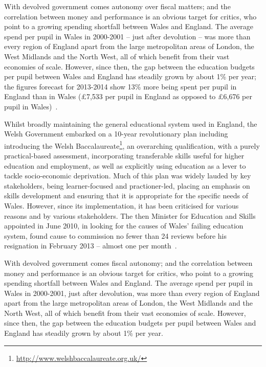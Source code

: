 With devolved government comes autonomy over fiscal matters; and the
correlation between money and performance is an obvious target for
critics, who point to a growing spending shortfall between Wales and
England.  The average spend per pupil in Wales in 2000-2001 -- just
after devolution -- was more than every region of England apart from
the large metropolitan areas of London, the West Midlands and the
North West, all of which benefit from their vast economies of scale.
However, since then, the gap between the education budgets per pupil
between Wales and England has steadily grown by about 1\% per year;
the figures forecast for 2013-2014 show 13\% more being spent per
pupil in England than in Wales (\pounds7,533 per pupil in England as
opposed to \pounds6,676 per pupil in Wales)~\cite{Evans:2015}.

Whilst broadly maintaining the general educational system used in
England, the Welsh Government embarked on a 10-year revolutionary plan
including introducing the Welsh
Baccalaureate\footnote{\url{http://www.welshbaccalaureate.org.uk/}},
an overarching qualification, with a purely practical-based
assessment, incorporating transferable skills useful for higher
education and employment, as well as explicitly using education as a
lever to tackle socio-economic deprivation. Much of this plan was
widely lauded by key stakeholders, being learner-focused and
practioner-led, placing an emphasis on skills development and ensuring
that it is appropriate for the specific needs of Wales. However, since
its implementation, it has been criticised for various reasons and by
various stakeholders.  The then Minister for Education and Skills
appointed in June 2010, in looking for the causes of Wales' failing
education system, found cause to commission no fewer than 24 reviews
before his resignation in February 2013 -- almost one per
month~\cite{Evans:2015}.

With devolved government comes fiscal autonomy; and the
correlation between money and performance is an obvious target for
critics, who point to a growing spending shortfall between Wales and
England.  The average spend per pupil in Wales in 2000-2001, just
after devolution, was more than every region of England apart from
the large metropolitan areas of London, the West Midlands and the
North West, all of which benefit from their vast economies of scale.
However, since then, the gap between the education budgets per pupil
between Wales and England has steadily grown by about 1\% per year.

